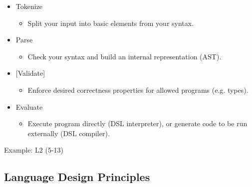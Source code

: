 \documentclass{article}
\begin{document}
\begin{itemize}
    \item Tokenize
    \begin{itemize}
        \item Split your input into basic elements from your syntax.
    \end{itemize}
    \item Parse
    \begin{itemize}
        \item Check your syntax and build an internal representation (AST).
    \end{itemize}
    \item {[Validate]}
    \begin{itemize}
        \item Enforce desired correctness properties for allowed programs (e.g. types).
    \end{itemize}
    \item Evaluate
    \begin{itemize}
        \item Execute program directly (DSL interpreter), or generate code to be run externally (DSL compiler).
    \end{itemize}
\end{itemize}

Example: L2 (5-13)

\subsection{Language Design Principles}
\end{document}
